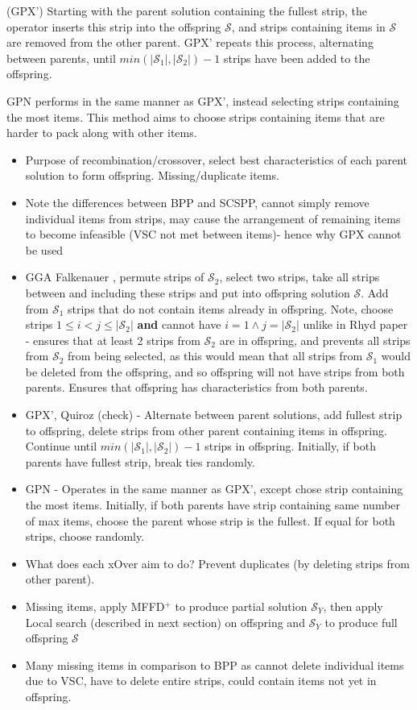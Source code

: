 \documentclass{elsarticle}
\begin{document}
(GPX') Starting with the parent solution containing the fullest strip, the operator inserts this strip into the offspring $\mathcal{S}$, and strips containing items in $\mathcal{S}$ are removed from the other parent. GPX' repeats this process, alternating between parents, until $min (|\mathcal{S}_1|,|\mathcal{S}_2|) - 1$ strips have been added to the offspring.

GPN performs in the same manner as GPX', instead selecting strips containing the most items. This method aims to choose strips containing items that are harder to pack along with other items.

{\color{OrangeRed}
\begin{itemize}
	\item Purpose of recombination/crossover, select best characteristics of each parent solution to form offspring. Missing/duplicate items.
	\item Note the differences between BPP and SCSPP, cannot simply remove individual items from strips, may cause the arrangement of remaining items to become infeasible (VSC not met between items)- hence why GPX cannot be used \cite{lewis2017}
	\item GGA Falkenauer \cite{falkenauer1992}, permute strips of $\mathcal{S}_2$, select two strips, take all strips between and including these strips and put into offspring solution $\mathcal{S}$. Add from $\mathcal{S}_1$ strips that do not contain items already in offspring. Note, choose strips $1 \leq i < j \leq |\mathcal{S}_2|$ \textbf{and} cannot have $i = 1 \land j = |\mathcal{S}_2|$ unlike in Rhyd paper - ensures that at least 2 strips from $\mathcal{S}_2$ are in offspring, and prevents all strips from $\mathcal{S}_2$ from being selected, as this would mean that all strips from $\mathcal{S}_1$ would be deleted from the offspring, and so offspring will not have strips from both parents. Ensures that offspring has characteristics from both parents.
	\item GPX', Quiroz \cite{quiroz2015} (check) - Alternate between parent solutions, add fullest strip to offspring, delete strips from other parent containing items in offspring. Continue until $min(|\mathcal{S}_1|,|\mathcal{S}_2|)-1$ strips in offspring. Initially, if both parents have fullest strip, break ties randomly.
	\item GPN - Operates in the same manner as GPX', except chose strip containing the most items. Initially, if both parents have strip containing same number of max items, choose the parent whose strip is the fullest. If equal for both strips, choose randomly.
	\item What does each xOver aim to do? Prevent duplicates (by deleting strips from other parent).
	\item Missing items, apply MFFD$^+$ to produce partial solution $\mathcal{S}_Y$, then apply Local search (described in next section) on offspring and $\mathcal{S}_Y$ to produce full offspring $\mathcal{S}$
	\item Many missing items in comparison to BPP as cannot delete individual items due to VSC, have to delete entire strips, could contain items not yet in offspring.
\end{itemize}
}
\end{document}
